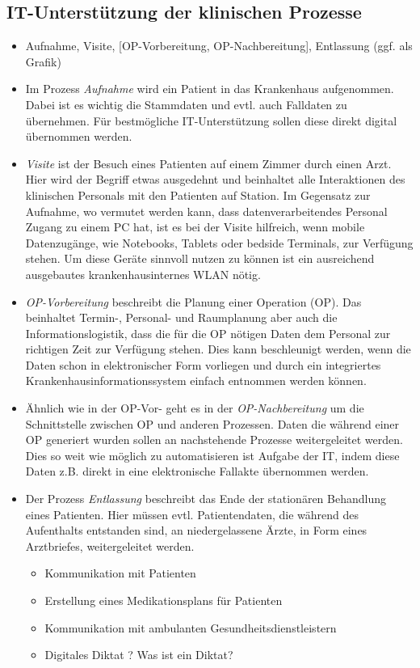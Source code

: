 \subsection{IT-Unterstützung der klinischen Prozesse}
\label{sec:klinischeProzesse}
	\begin{itemize}
		\item Aufnahme, Visite, [OP-Vorbereitung, OP-Nachbereitung], Entlassung (ggf. als Grafik) \parencite[37]{huebner2019}
		\item Im Prozess \textit{Aufnahme} wird ein Patient in das Krankenhaus aufgenommen. Dabei ist es wichtig die Stammdaten und evtl. auch Falldaten zu übernehmen. Für bestmögliche IT-Unterstützung sollen diese direkt digital übernommen werden. 
		\item \textit{Visite} ist der Besuch eines Patienten auf einem Zimmer durch einen Arzt. Hier wird der Begriff etwas ausgedehnt und beinhaltet alle Interaktionen des klinischen Personals mit den Patienten auf Station. Im Gegensatz zur Aufnahme, wo vermutet werden kann, dass datenverarbeitendes Personal Zugang zu einem PC hat, ist es bei der Visite hilfreich, wenn mobile Datenzugänge, wie Notebooks, Tablets oder bedside Terminals, zur Verfügung stehen. Um diese Geräte sinnvoll nutzen zu können ist ein ausreichend ausgebautes krankenhausinternes WLAN nötig.
		\item \textit{OP-Vorbereitung} beschreibt die Planung einer Operation (OP). Das beinhaltet Termin-, Personal- und Raumplanung aber auch die Informationslogistik, dass die für die OP nötigen Daten dem Personal zur richtigen Zeit zur Verfügung stehen. Dies kann beschleunigt werden, wenn die Daten schon in elektronischer Form vorliegen und durch ein integriertes Krankenhausinformationssystem einfach entnommen werden können.
		\item Ähnlich wie in der OP-Vor- geht es in der \textit{OP-Nachbereitung} um die Schnittstelle zwischen OP und anderen Prozessen. Daten die während einer OP generiert wurden sollen an nachstehende Prozesse weitergeleitet werden. Dies so weit wie möglich zu automatisieren ist Aufgabe der IT, indem diese Daten z.B. direkt in eine elektronische Fallakte übernommen werden.
		\item Der Prozess \textit{Entlassung} beschreibt das Ende der stationären Behandlung eines Patienten. Hier müssen evtl. Patientendaten, die während des Aufenthalts entstanden sind, an niedergelassene Ärzte, in Form eines Arztbriefes, weitergeleitet werden. 
		\begin{itemize}
			\item Kommunikation mit Patienten
			\item Erstellung eines Medikationsplans für Patienten
			\item Kommunikation mit ambulanten Gesundheitsdienstleistern
			\item Digitales Diktat ? Was ist ein Diktat?
		\end{itemize}
	\end{itemize}
